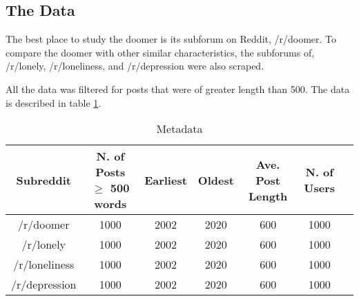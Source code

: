 \documentclass[../report.tex]{subfiles}
\begin{document}
\subsection{The Data}
The best place to study the doomer is its subforum on Reddit, /r/doomer. To compare the doomer with other similar characteristics, the subforums of, /r/lonely, /r/loneliness, and /r/depression were also scraped.

All the data was filtered for posts that were of greater length than 500. The data is described in table \ref{tab:metadata}.

\begin{table}[h]
    \centering
    \begin{tabular}[]{c | c | c | c | c | c | c}
        \toprule
        Subreddit & N. of Posts $\ge$ 500 words & Earliest & Oldest & Ave. Post Length & N. of Users \\
        \midrule
        /r/doomer & 1000 & 2002 & 2020 & 600 & 1000 \\
        /r/lonely & 1000 & 2002 & 2020 & 600 & 1000 \\
        /r/loneliness & 1000 & 2002 & 2020 & 600 & 1000 \\
        /r/depression & 1000 & 2002 & 2020 & 600 & 1000 \\
        \bottomrule
    \end{tabular}

    \caption{Metadata}
    \label{tab:metadata}
\end{table}
\end{document}
